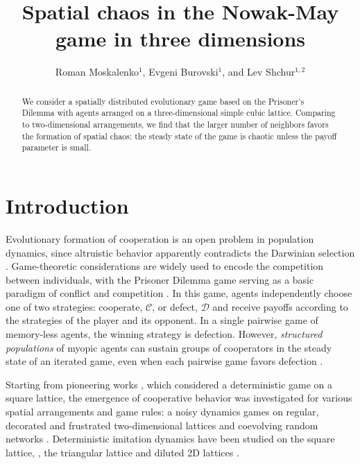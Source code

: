 \documentclass[a4paper]{jpconf}
\begin{document}
\title{Spatial chaos in the Nowak-May game in three dimensions}
%
\author{Roman Moskalenko$^{1}$, Evgeni Burovski$^{1}$, and Lev Shchur$^{1, 2}$}
%
\address{$^1$ National Research University Higher School of Economics, 101000 Moscow, Russia}
\address{$^2$ Landau Institute for Theoretical Physics, 142432 Chernogolovka, Russia}


\begin{abstract}
We consider a spatially distributed evolutionary game based on the Prisoner's Dilemma 
with agents arranged on a three-dimensional simple cubic lattice. 
Comparing to two-dimensional arrangements, we find that the larger number of
neighbors favors the formation of spatial chaos: the steady state of the game 
is chaotic unless the payoff parameter is small.
\end{abstract}

\section{Introduction}

Evolutionary formation of cooperation is an open problem
in population dynamics, since altruistic behavior apparently contradicts the
Darwinian selection \cite{Axelrod2006}.
Game-theoretic considerations are widely used to encode the competition between
individuals, with the Prisoner Dilemma game serving as a basic paradigm of
conflict and competition \cite{Smith1982}.
In this game, agents independently choose one of two strategies: 
cooperate, $\mathcal{C}$, or defect, $\mathcal{D}$ and receive payoffs according
to the strategies of the player and its opponent. In a single pairwise game of
memory-less agents, the winning strategy is defection. However,
\emph{structured populations} of myopic agents can sustain groups of
cooperators in the steady state of an iterated game, even when each pairwise
game favors defection \cite{Nowak1992}.

Starting from pioneering works \cite{Nowak1992, Nowak1993}, which considered
a deterministic game on a square lattice, the emergence of cooperative behavior
was investigated for various spatial arrangements and game rules: a noisy
dynamics games on regular, decorated and frustrated two-dimensional lattices
\cite{Szolnoki2005, Hauert2005, Szolnoki2017} and coevolving random networks
\cite{Szolnoki2009}. Deterministic imitation dynamics have been studied
on the square lattice, \cite{Kolotev2018}, the triangular lattice
\cite{Burovski2019} and diluted 2D lattices \cite{Arenzon2001}.
\end{document}

